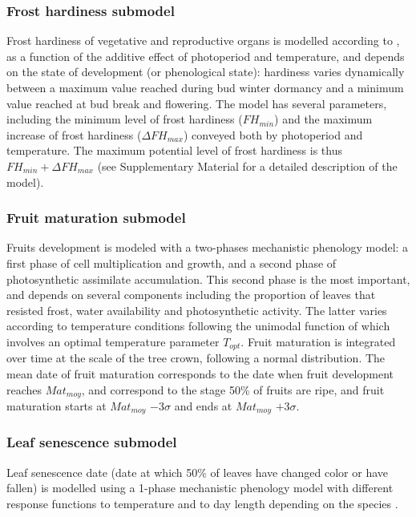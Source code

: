 \documentclass[preprint,12pt,authoryear]{elsarticle}
\begin{document}
\subsubsection{Frost hardiness submodel}

Frost hardiness of vegetative and reproductive organs is modelled according to \citet{Leinonen1996}, as a function of the additive effect of photoperiod and temperature, and depends on the state of development (or phenological state): hardiness varies dynamically between a maximum value reached during bud winter dormancy and a minimum value reached at bud break and flowering. The model has several parameters, including the minimum level of frost hardiness ($FH_{min}$) and the maximum increase of frost hardiness ($\Delta FH_{max}$) conveyed both by photoperiod and temperature. The maximum potential level of frost hardiness is thus $FH_{min}+\Delta FH_{max}$ (see Supplementary Material for a detailed description of the model). 

\subsubsection{Fruit maturation submodel}

Fruits development is modeled with a two-phases mechanistic phenology model:  a first phase of cell multiplication and growth, and a second phase of photosynthetic assimilate accumulation. This second phase is the most important, and depends on several components including the proportion of leaves that resisted frost, water availability and photosynthetic activity. The latter varies according to temperature conditions following the unimodal function of \citet{Wang1998} which involves an optimal temperature parameter $T_{opt}$.  Fruit maturation is integrated over time at the scale of the tree crown, following a normal distribution. The mean date of fruit maturation corresponds to the date when fruit development reaches $Mat_{moy}$, and correspond to the stage 50\% of fruits are ripe,  and fruit maturation starts at $Mat_{moy}$ $-3\sigma$ and ends at $Mat_{moy}$ $+3\sigma$.

\subsubsection{Leaf senescence submodel}
Leaf senescence date (date at which 50\% of leaves have changed color or have fallen) is modelled using a 1-phase mechanistic phenology model with different response functions to temperature and to day length depending on the species \citep{Delpierre2009}. 
\end{document}
